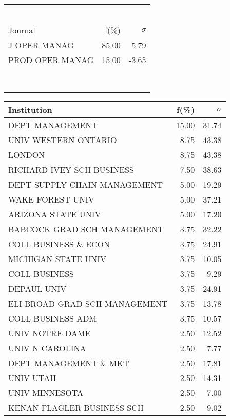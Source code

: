 \documentclass[a4paper,11pt]{report}
\begin{document}
\begin{landscape}
\begin{table}[!ht]
{\begin{tabular}{|l r  r|}
 &  & \\
 &  & \\
 &  & \\
 &  & \\
 &  & \\
 &  & \\
\hline
\hline
Journal & f(\%) & $\sigma$\\
\hline
J OPER MANAG & 85.00 & 5.79\\
PROD OPER MANAG & 15.00 & -3.65\\
 &  & \\
 &  & \\
 &  & \\
 &  & \\
 &  & \\
 &  & \\
 &  & \\
 &  & \\
\hline
\end{tabular}
}
{\scriptsize\begin{tabular}{|l r r|}
\hline
Institution & f(\%) & $\sigma$\\
\hline
DEPT MANAGEMENT & 15.00 & 31.74\\
UNIV WESTERN ONTARIO & 8.75 & 43.38\\
LONDON & 8.75 & 43.38\\
RICHARD IVEY SCH BUSINESS & 7.50 & 38.63\\
DEPT SUPPLY CHAIN MANAGEMENT & 5.00 & 19.29\\
WAKE FOREST UNIV & 5.00 & 37.21\\
ARIZONA STATE UNIV & 5.00 & 17.20\\
BABCOCK GRAD SCH MANAGEMENT & 3.75 & 32.22\\
COLL BUSINESS \& ECON & 3.75 & 24.91\\
MICHIGAN STATE UNIV & 3.75 & 10.05\\
COLL BUSINESS & 3.75 & 9.29\\
DEPAUL UNIV & 3.75 & 24.91\\
ELI BROAD GRAD SCH MANAGEMENT & 3.75 & 13.78\\
COLL BUSINESS ADM & 3.75 & 10.57\\
UNIV NOTRE DAME & 2.50 & 12.52\\
UNIV N CAROLINA & 2.50 & 7.77\\
DEPT MANAGEMENT \& MKT & 2.50 & 17.81\\
UNIV UTAH & 2.50 & 14.31\\
UNIV MINNESOTA & 2.50 & 7.00\\
KENAN FLAGLER BUSINESS SCH & 2.50 & 9.02\\

\end{tabular}}
\end{table}
\end{landscape}
\end{document}
